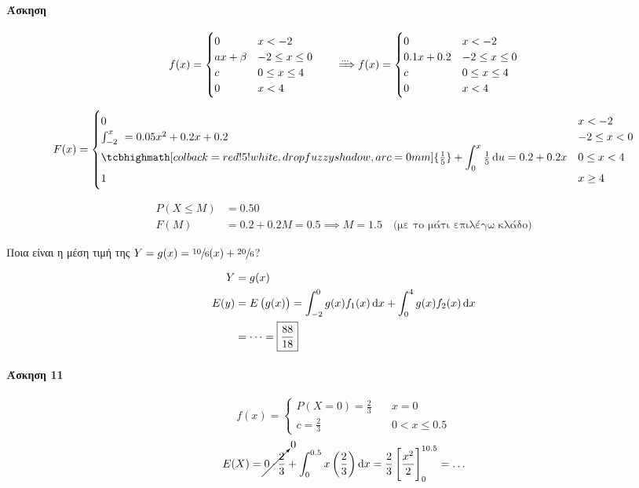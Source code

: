 \documentclass[11pt,a4paper,titlepage,draft]{article}
\newcommand{\attnboxed}[1]{\tcbhighmath[colback=red!5!white,drop fuzzy shadow,arc=0mm]{#1}}
\begin{document}
\paragraph{Άσκηση}

\[
f(x)=\begin{cases}
0&x<-2\\ax+\beta&-2\leq x\leq0\\c&0\leq x\leq4\\0&x<4
\end{cases}
\qquad
\xRightarrow{\dots}
f(x)=\begin{cases}
0&x<-2\\0.1x+0.2&-2\leq x\leq0\\c&0\leq x\leq4\\0&x<4
\end{cases}
\]

\[
F(x)=\begin{cases}
0&x<-2\\
\int_{-2}^x\ = 0.05x^2+0.2x+0.2&-2\leq x < 0\\
\attnboxed{\frac{1}{5}}+\displaystyle\int_0^x\textstyle \frac{1}{5}\dif u = 0.2+0.2x & 0 \leq x < 4\\
1&x\geq 4
\end{cases}
\]

\begin{attnbox}{}
\begin{align*}
P(X\leq M) &= 0.50\\
F(M) &= 0.2+0.2Μ = 0.5 \implies \boxed{M=1.5} \quad \text{(με το μάτι επιλέγω κλάδο)}
\end{align*}

Ποια είναι η μέση τιμή της \(Y=g(x)=\sfrac{10}{6}(x)+\sfrac{20}{6}\)?

\begin{align*}
Y&=g(x)\\
E(y)&=E\left(g(x)\right)=\int_{-2}^0 g(x)f_1(x)\dif x + \int_0^4 g(x)f_2(x)\dif x
\\
&= \dots = \boxed{\frac{88}{18}}
\end{align*}
\end{attnbox}

\paragraph{Άσκηση 11}
\[
f(x)=\begin{cases}
P(X=0)=\frac{2}{3}\quad&x=0\\
c=\frac{2}{3}& 0 < x \leq 0.5
\end{cases}
\]
\begin{gather*}
E(X)=\cancelto{0}{0\cdot\frac{2}{3}}+\int_0^{0.5}x\left(\frac{2}{3}\right)\dif x = \frac{2}{3}\left[
\frac{x^2}{2}
\right]_0^{10.5}=\dots
\end{gather*}
\end{document}
